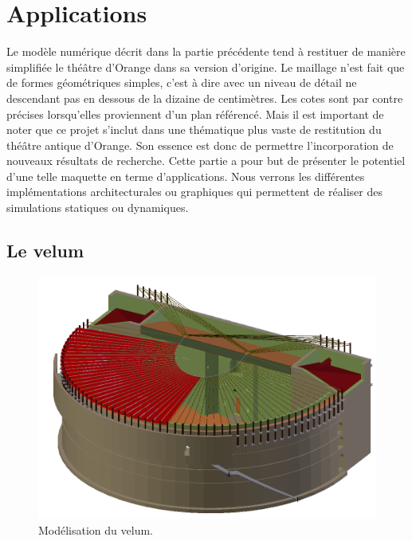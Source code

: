 		
		
		
		
		
		
		
		
		
\chapter{Applications}
	\minitoc
	\newpage

Le modèle numérique décrit dans la partie précédente tend à restituer de manière simplifiée le théâtre d'Orange dans sa version d'origine. Le maillage n'est fait que de formes géométriques simples, c'est à dire avec un niveau de détail ne descendant pas en dessous de la dizaine de centimètres. Les cotes sont par contre précises lorsqu'elles proviennent d'un plan référencé. Mais il est important de noter que ce projet s'inclut dans une thématique plus vaste de restitution du théâtre antique d'Orange. Son essence est donc de permettre l'incorporation de nouveaux résultats de recherche. Cette partie a pour but de présenter le potentiel d'une telle maquette en terme d'applications. Nous verrons les différentes implémentations architecturales ou graphiques qui permettent de réaliser des simulations statiques ou dynamiques.

\section{Le \gls{velum}} \label{sect_velum}

\begin{figure}[!h]
	\centering
	\includegraphics[width=\textwidth]{images/modVelum}
	\caption{Modélisation du \gls{velum}.} 
	\label{modVelum} 
\end{figure}

